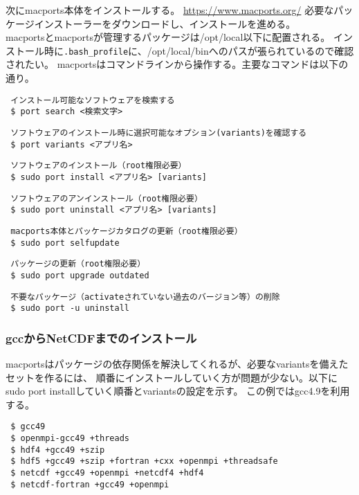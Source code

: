 次にmacports本体をインストールする。
\url{https://www.macports.org/}
必要なパッケージインストーラーをダウンロードし、インストールを進める。\\
macportsとmacportsが管理するパッケージは/opt/local以下に配置される。
インストール時に\verb|.bash_profile|に、/opt/local/binへのパスが張られているので確認されたい。
macportsはコマンドラインから操作する。主要なコマンドは以下の通り。

\begin{verbatim}
 インストール可能なソフトウェアを検索する
 $ port search <検索文字>
\end{verbatim}
\begin{verbatim}
 ソフトウェアのインストール時に選択可能なオプション(variants)を確認する
 $ port variants <アプリ名>
\end{verbatim}
\begin{verbatim}
 ソフトウェアのインストール（root権限必要）
 $ sudo port install <アプリ名> [variants]
\end{verbatim}
\begin{verbatim}
 ソフトウェアのアンインストール（root権限必要）
 $ sudo port uninstall <アプリ名> [variants]
\end{verbatim}
\begin{verbatim}
 macports本体とパッケージカタログの更新（root権限必要）
 $ sudo port selfupdate
\end{verbatim}
\begin{verbatim}
 パッケージの更新（root権限必要）
 $ sudo port upgrade outdated
\end{verbatim}
\begin{verbatim}
 不要なパッケージ（activateされていない過去のバージョン等）の削除
 $ sudo port -u uninstall
\end{verbatim}

\subsubsection{gccからNetCDFまでのインストール}

macportsはパッケージの依存関係を解決してくれるが、必要なvariantsを備えたセットを作るには、
順番にインストールしていく方が問題が少ない。以下にsudo port installしていく順番とvariantsの設定を示す。
この例ではgcc4.9を利用する。
\begin{verbatim}
 $ gcc49
 $ openmpi-gcc49 +threads
 $ hdf4 +gcc49 +szip
 $ hdf5 +gcc49 +szip +fortran +cxx +openmpi +threadsafe
 $ netcdf +gcc49 +openmpi +netcdf4 +hdf4
 $ netcdf-fortran +gcc49 +openmpi
\end{verbatim}


